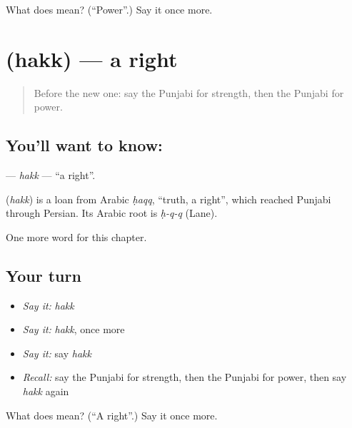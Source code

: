 \begin{tcolorbox}[breakable,colback=teal!4,colframe=teal!35!black,title={Before you move on}]
What does  mean? (\textquotedblleft{}Power\textquotedblright{}.) Say it once more.
\end{tcolorbox}
\section[\texorpdfstring{\pa{ਹੱਕ} (hakk)}{ਹੱਕ (hakk)}]{ (hakk) — a right}

\label{lesson:PA-C110-hakk}



\begin{quote}
Before the new one: say the Punjabi for strength, then the Punjabi for power.
\end{quote}

\subsection*{You'll want to know: }
\textbf{} — \emph{hakk} — \textquotedblleft{}a right\textquotedblright{}.

\begin{cousinweb}
\textbf{} (\emph{hakk}) is a loan from Arabic \emph{ḥaqq}, \textquotedblleft{}truth, a right\textquotedblright{}, which reached Punjabi through Persian. Its Arabic root is \emph{ḥ-q-q} (Lane).
\end{cousinweb}

\begin{grammarlens}[title={What you've built}]
One more word for this chapter.
\end{grammarlens}

\subsection*{Your turn}
\begin{itemize}
\raggedright
  \item \emph{Say it:} \emph{hakk}
  \item \emph{Say it:} \emph{hakk}, once more
  \item \emph{Say it:} say \emph{hakk}
  \item \emph{Recall:} say the Punjabi for strength, then the Punjabi for power, then say \emph{hakk} again
\end{itemize}

\begin{tcolorbox}[breakable,colback=teal!4,colframe=teal!35!black,title={Before you move on}]
What does  mean? (\textquotedblleft{}A right\textquotedblright{}.) Say it once more.
\end{tcolorbox}
